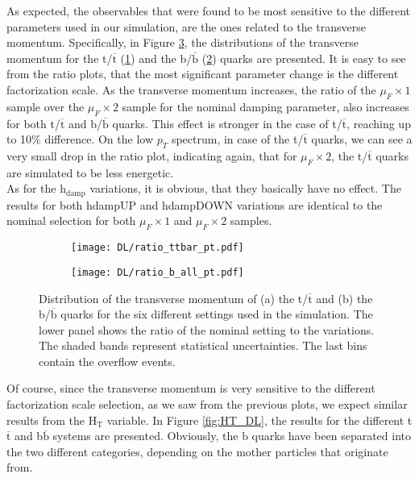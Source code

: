 \indent As  expected, the observables that were found to be most sensitive to the different parameters used in our simulation, are the ones related to the transverse momentum. Specifically, in Figure \ref{fig:pt_DL}, the distributions of the transverse momentum for the t/$\overline{\text{t}}$ (\ref{subfig:pt(t,tbar)_DL}) and the b/$\overline{\text{b}}$ (\ref{subfig:pt(b_all)_DL}) quarks are presented. It is easy to see from the ratio plots, that the most significant parameter change is the different factorization scale. As the transverse momentum increases, the ratio of the $\mu_F \times 1$ sample over the $\mu_F \times 2$ sample for the nominal damping parameter, also increases for both t/$\overline{\text{t}}$ and b/$\overline{\text{b}}$ quarks. This effect is stronger in the case of t/$\overline{\text{t}}$, reaching up to 10\% difference. On the low $p_T$ spectrum, in case of the t/$\overline{\text{t}}$ quarks, we can see a very small drop in the ratio plot, indicating again, that for $\mu_F \times 2$, the t/$\overline{\text{t}}$ quarks are simulated to be less energetic. \\
\indent As for the h$_{\text{damp}}$ variations, it is obvious, that they basically have no effect. The results for both hdampUP and hdampDOWN variations are identical to the nominal selection for both $\mu_F \times 1$ and $\mu_F \times 2$ samples.
\begin{figure}[H]
    \centering
    \begin{subfigure}{0.49\textwidth}
        \centering
        \texttt{[image: DL/ratio\_ttbar\_pt.pdf]}
        \caption{}
        \label{subfig:pt(t,tbar)_DL}        
    \end{subfigure}
    \hfill
    \begin{subfigure}{0.49\linewidth}
        \centering
        \texttt{[image: DL/ratio\_b\_all\_pt.pdf]}
        \caption{}
        \label{subfig:pt(b_all)_DL}
    \end{subfigure}
    \caption{Distribution of the transverse momentum of (a) the t/$\overline{\text{t}}$ and (b) the b/$\overline{\text{b}}$ quarks for the six different settings used in the simulation. The lower panel shows the ratio of the nominal setting to the variations. The shaded bands represent statistical uncertainties. The last bins contain the overflow events.}
    \label{fig:pt_DL}
\end{figure}
\indent Of course, since the transverse momentum is very sensitive to the different factorization scale selection, as we saw from the previous plots, we expect similar results from the H$_{\text{T}}$ variable. In Figure \ref{fig:HT_DL}, the results for the different t$\overline{\text{t}}$ and b$\overline{\text{b}}$ systems are presented. Obviously, the b quarks have been separated into the two different categories, depending on the mother particles that originate from.\\
